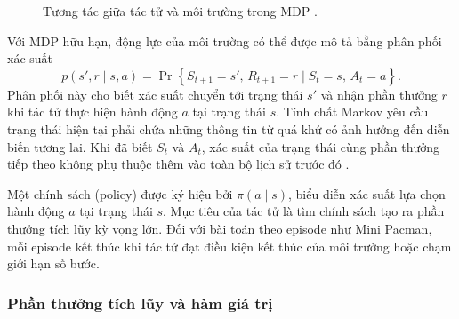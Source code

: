\begin{figure}[H]
    \centering
    \caption{Tương tác giữa tác tử và môi trường trong MDP \cite{SuttonBarto2018}.}
    \label{fig:agent-environment}
\end{figure}

Với MDP hữu hạn, động lực của môi trường có thể được mô tả bằng phân phối xác suất
\begin{equation}
    p(s',r \mid s,a)
    =
    \Pr\!\left\{
        S_{t+1}=s',\,R_{t+1}=r
        \mid
        S_t=s,\,A_t=a
    \right\}.
    \label{eq:mdp-dynamics}
\end{equation}
Phân phối này cho biết xác suất chuyển tới trạng thái $s'$ và nhận phần thưởng $r$ khi tác tử thực hiện hành động $a$ tại trạng thái $s$. Tính chất Markov yêu cầu trạng thái hiện tại phải chứa những thông tin từ quá khứ có ảnh hưởng đến diễn biến tương lai. Khi đã biết $S_t$ và $A_t$, xác suất của trạng thái cùng phần thưởng tiếp theo không phụ thuộc thêm vào toàn bộ lịch sử trước đó \cite{SuttonBarto2018}.

Một chính sách (policy) được ký hiệu bởi $\pi(a \mid s)$, biểu diễn xác suất lựa chọn hành động $a$ tại trạng thái $s$. Mục tiêu của tác tử là tìm chính sách tạo ra phần thưởng tích lũy kỳ vọng lớn. Đối với bài toán theo episode như Mini Pacman, mỗi episode kết thúc khi tác tử đạt điều kiện kết thúc của môi trường hoặc chạm giới hạn số bước.

\subsubsection{Phần thưởng tích lũy và hàm giá trị}


